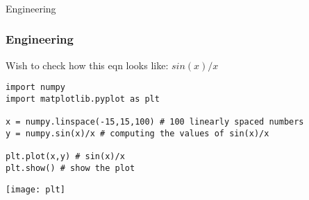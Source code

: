 \begin{frame}[fragile]\frametitle{}
\begin{center}
{\Large Engineering}
\end{center}
\end{frame}


\begin{frame}[fragile]\frametitle{Engineering}
Wish to check how this eqn looks like: $sin(x)/x$
\begin{lstlisting}
import numpy
import matplotlib.pyplot as plt

x = numpy.linspace(-15,15,100) # 100 linearly spaced numbers
y = numpy.sin(x)/x # computing the values of sin(x)/x

plt.plot(x,y) # sin(x)/x
plt.show() # show the plot
\end{lstlisting}
\begin{center}
\texttt{[image: plt]}
\end{center}
\end{frame}

